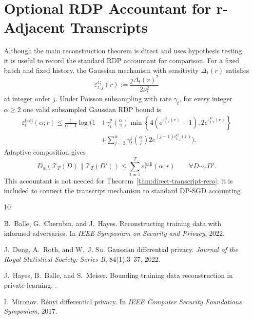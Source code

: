 \documentclass[conference,compsoc]{IEEEtran}
\newcommand{\cT}{\mathcal{T}}
\newcommand{\eps}{\varepsilon}
\begin{document}
\section{Optional RDP Accountant for r-Adjacent Transcripts}
\label{app:rdp-accountant}

Although the main reconstruction theorem is direct and uses hypothesis testing, it is useful to record the standard RDP accountant for comparison. For a fixed batch and fixed history, the Gaussian mechanism with sensitivity $\Delta_t(r)$ satisfies
\[
\eps_{t,j}^{\mathrm G}(r):=\frac{j\Delta_t(r)^2}{2\nu_t^2}
\]
at integer order $j$. Under Poisson subsampling with rate $\gamma_t$, for every integer $\alpha\ge2$ one valid subsampled Gaussian RDP bound is
\[
\begin{aligned}
\eps_t^{\mathrm{ball}}(\alpha;r)
\le
\frac1{\alpha-1}
\log\Bigg(
1
&+
\gamma_t^2\binom{\alpha}{2}
\min\left\{
4\left(e^{\eps_{t,2}^{\mathrm G}(r)}-1\right),
2e^{\eps_{t,2}^{\mathrm G}(r)}
\right\}\\
&+
\sum_{j=3}^{\alpha}
\gamma_t^j\binom{\alpha}{j}
2e^{(j-1)\eps_{t,j}^{\mathrm G}(r)}
\Bigg).
\end{aligned}
\]
Adaptive composition gives
\[
D_\alpha(\cT_T(D)\|\cT_T(D'))
\le
\sum_{t=1}^T\eps_t^{\mathrm{ball}}(\alpha;r)
\qquad\forall D\sim_r D'.
\]
This accountant is not needed for Theorem~\ref{thm:direct-transcript-rero}; it is included to connect the transcript mechanism to standard DP-SGD accounting.

\begin{thebibliography}{10}

B.~Balle, G.~Cherubin, and J.~Hayes.
\newblock Reconstructing training data with informed adversaries.
\newblock In \emph{IEEE Symposium on Security and Privacy}, 2022.

J.~Dong, A.~Roth, and W.~J. Su.
\newblock Gaussian differential privacy.
\newblock \emph{Journal of the Royal Statistical Society: Series B}, 84(1):3--37, 2022.

J.~Hayes, B.~Balle, and S.~Meiser.
\newblock Bounding training data reconstruction in private learning.
.

I.~Mironov.
\newblock R\'enyi differential privacy.
\newblock In \emph{IEEE Computer Security Foundations Symposium}, 2017.

\end{thebibliography}
\end{document}
